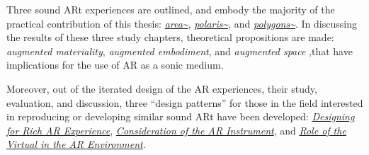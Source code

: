 \noindent Three sound ARt experiences are outlined, and embody the majority of the practical contribution of this thesis: \textit{\href{https://github.com/sambilbow/area}{area\textasciitilde{}}}, \textit{\href{https://github.com/sambilbow/polaris}{polaris\textasciitilde{}}}, and \textit{\href{https://github.com/sambilbow/polygons}{polygons\textasciitilde{}}}. In discussing the results of these three study chapters, theoretical propositions are made: \textit{augmented materiality}, \textit{augmented embodiment}, and \textit{augmented space} ,that have implications for the use of AR as a sonic medium.

\noindent Moreover, out of the iterated design of the AR experiences, their study, evaluation, and discussion, three ``design patterns'' for those in the field interested in reproducing or developing similar sound ARt have been developed: \textit{\href{https://thexrt.space/design-patterns/rich-ar}{Designing for Rich AR Experience}}, \textit{\href{https://thexrt.space/design-patterns/ar-instrument}{Consideration of the AR Instrument}}, and \textit{\href{https://thexrt.space/design-patterns/virtual-role}{Role of the Virtual in the AR Environment}}.